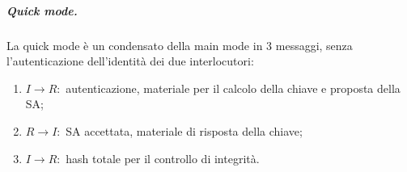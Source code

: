 \documentclass[a4paper, 10pt, twoside]{article}
\begin{document}
	\subparagraph{Quick mode.} La quick mode è un condensato della main mode in 3 messaggi, senza l'autenticazione dell'identità dei due interlocutori:\begin{enumerate}
		\item $I \to R:$ autenticazione, materiale per il calcolo della chiave e proposta della SA;
		\item $R \to I:$ SA accettata, materiale di risposta della chiave;
		\item $I \to R:$ hash totale per il controllo di integrità.
	\end{enumerate}
\end{document}
